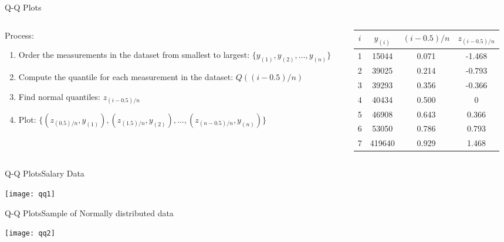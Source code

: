 \documentclass[xcolor=dvipsnames]{beamer}
\begin{document}
\begin{frame}{Q-Q Plots}
\begin{columns}
	\begin{column}{.45 \textwidth}
Process:
			\begin{enumerate}
				\item Order the measurements in the dataset from smallest to largest: $\{y_{(1)}, y_{(2)}, \hdots, y_{(n)} \}$ \pause
				\item Compute the quantile for each measurement in the dataset: $Q((i-0.5) /n)$ \pause
				\item Find normal quantiles: $z_{(i-0.5)/n}$ \pause
				\item Plot: $\{(z_{(0.5)/n}, y_{(1)}),(z_{(1.5)/n}, y_{(2)}),\hdots, (z_{(n-0.5)/n}, y_{(n)})\}$ \pause
			\end{enumerate}
	\end{column}
	\begin{column}{0.5 \textwidth}
		\vspace{-20pt}
		\begin{center}
			\begin{tabular}{|c|c|c|c|}
				\hline 
				$i$ & $y_{(i)}$ & $(i-0.5)/n$ & $z_{(i-0.5)/n}$ \\
				\hline \hline
				1 & 15044 & 0.071 & -1.468 \\ \hline
				2 & 39025 & 0.214 & -0.793 \\ \hline
				3 & 39293 & 0.356 & -0.366 \\ \hline
				4 & 40434 & 0.500 & 0 \\ \hline
				5 & 46908 & 0.643 & 0.366 \\ \hline
				6 & 53050 & 0.786 & 0.793 \\ \hline
				7 & 419640 & 0.929 & 1.468 \\ \hline
			\end{tabular}
		\end{center}
	\end{column}
\end{columns}

\end{frame}

\begin{frame}{Q-Q Plots}{Salary Data}
	\begin{center}
		\texttt{[image: qq1]}
	\end{center}
\end{frame}

\begin{frame}{Q-Q Plots}{Sample of Normally distributed data}
\begin{center}
	\texttt{[image: qq2]}
\end{center}
\end{frame}
\end{document}
